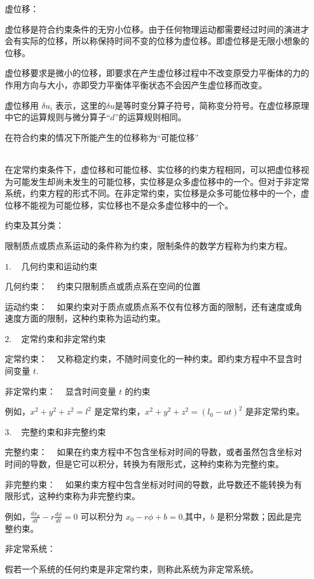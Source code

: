 \documentclass[12pt,a4paper]{article}
\begin{document}
$\textbf{虚位移}$：

虚位移是符合约束条件的无穷小位移。由于任何物理运动都需要经过时间的演进才会有实际的位移，所以称保持时间不变的位移为虚位移。即虚位移是无限小想象的位移。

虚位移要求是微小的位移，即要求在产生虚位移过程中不改变原受力平衡体的力的作用方向与大小，亦即受力平衡体平衡状态不会因产生虚位移而改变。

虚位移用 $\delta u_i$ 表示，这里的$\delta u$是等时变分算子符号，简称变分符号。在虚位移原理中它的运算规则与微分算子“$d$”的运算规则相同。

在符合约束的情况下所能产生的位移称为“可能位移”

~ \\

在定常约束条件下，虚位移和可能位移、实位移的约束方程相同，可以把虚位移视为可能发生却尚未发生的可能位移，实位移是众多虚位移中的一个。但对于非定常系统，约束方程的形式不同。在非定常约束，实位移是众多可能位移中的一个，虚位移不能视为可能位移，实位移也不是众多虚位移中的一个。


约束及其分类：

限制质点或质点系运动的条件称为约束，限制条件的数学方程称为约束方程。

$1$. ~ 几何约束和运动约束 

几何约束： ~ 约束只限制质点或质点系在空间的位置

运动约束： ~ 如果约束对于质点或质点系不仅有位移方面的限制，还有速度或角速度方面的限制，这种约束称为运动约束。

$2$. ~ 定常约束和非定常约束

定常约束： ~ 又称稳定约束，不随时间变化的一种约束。即约束方程中不显含时间变量 $t$.

非定常约束： ~ 显含时间变量 $t$ 的约束

例如，$x^2 +y^2 +z^2=l^2$ 是定常约束，$x^2 +y^2 +z^2=(l_0 -ut)^2$ 是非定常约束。

$3$. ~ 完整约束和非完整约束

完整约束： ~ 如果在约束方程中不包含坐标对时间的导数，或者虽然包含坐标对时间的导数，但是它可以积分，转换为有限形式，这种约束称为完整约束。

非完整约束： ~ 如果约束方程中包含坐标对时间的导数，此导数还不能转换为有限形式，这种约束称为非完整约束。

例如，$\frac{dx_0}{dt}-r\frac{d\phi}{dt}=0$ 可以积分为 $x_0-r\phi +b=0$,其中，$b$ 是积分常数；因此是完整约束。

非定常系统：

假若一个系统的任何约束是非定常约束，则称此系统为非定常系统。
\end{document}
